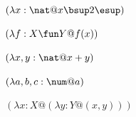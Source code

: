\documentclass[a4paper,10pt,fleqn]{article}
\begin{document}
\noindent
$(\lambda x : \nat @ x \bsup 2 \esup)$


\noindent
$(\lambda f : X \fun Y @ f(x))$


\noindent
$(\lambda x, y : \nat @ x + y)$


\noindent
$(\lambda a, b, c : \num @ a)$


\noindent
$(\lambda x : X @ (\lambda y : Y @ (x, y)))$
\end{document}
